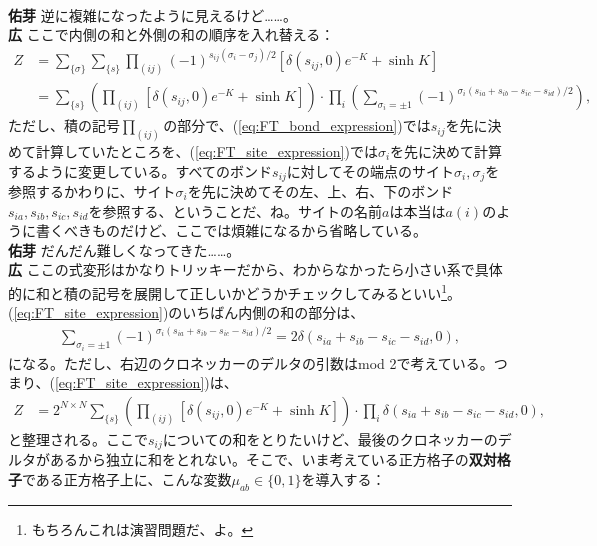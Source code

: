 \documentclass[paper=b5j,fontsize=12Q,jafontsize=12Q,baselineskip=21Q]{jlreq}
\DeclareRobustCommand{\hiron}{\textbf{広 }}
\DeclareRobustCommand{\umen}{\textbf{佑芽 }}
\begin{document}
\begin{refsection}
\begin{align}
\end{align}
\umen 逆に複雑になったように見えるけど……。
\\\hiron ここで内側の和と外側の和の順序を入れ替える：
\begin{align}
  Z&=\sum_{\{\sigma\}}\sum_{\{s\}}\prod_{(ij)}(-1)^{s_{ij}(\sigma_i-\sigma_j)/2}\left[\delta(s_{ij},0)e^{-K}+\sinh K\right]\label{eq:FT_bond_expression}\\
  &=\sum_{\{s\}}\left(\prod_{(ij)}\left[\delta(s_{ij},0)e^{-K}+\sinh K\right]\right)\cdot\prod_i\left(\sum_{\sigma_i=\pm 1}(-1)^{\sigma_i(s_{ia}+s_{ib}-s_{ic}-s_{id})/2}\right),\label{eq:FT_site_expression}
\end{align}
ただし、積の記号$\prod_{(ij)}$の部分で、(\ref{eq:FT_bond_expression})では$s_{ij}$を先に決めて計算していたところを、(\ref{eq:FT_site_expression})では$\sigma_i$を先に決めて計算するように変更している。すべてのボンド$s_{ij}$に対してその端点のサイト$\sigma_i,\sigma_j$を参照するかわりに、サイト$\sigma_i$を先に決めてその左、上、右、下のボンド$s_{ia},s_{ib},s_{ic},s_{id}$を参照する、ということだ、ね。サイトの名前$a$は本当は$a(i)$のように書くべきものだけど、ここでは煩雑になるから省略している。
\\\umen だんだん難しくなってきた……。
\\\hiron ここの式変形はかなりトリッキーだから、わからなかったら小さい系で具体的に和と積の記号を展開して正しいかどうかチェックしてみるといい\footnote{もちろんこれは演習問題だ、よ。}。(\ref{eq:FT_site_expression})のいちばん内側の和の部分は、
\begin{align}
  \sum_{\sigma_i=\pm 1}(-1)^{\sigma_i(s_{ia}+s_{ib}-s_{ic}-s_{id})/2}=2\delta(s_{ia}+s_{ib}-s_{ic}-s_{id},0),
\end{align}
になる。ただし、右辺のクロネッカーのデルタの引数はmod 2で考えている。つまり、(\ref{eq:FT_site_expression})は、
\begin{align}
  Z&=2^{N\times N}\sum_{\{s\}}\left(\prod_{(ij)}\left[\delta(s_{ij},0)e^{-K}+\sinh K\right]\right)\cdot \prod_i\delta(s_{ia}+s_{ib}-s_{ic}-s_{id},0),\label{eq:distribution_function_ising_bond_sum}
\end{align}
と整理される。ここで$s_{ij}$についての和をとりたいけど、最後のクロネッカーのデルタがあるから独立に和をとれない。そこで、いま考えている正方格子の\textbf{双対格子}である正方格子上に、こんな変数$\mu_{ab}\in\{0,1\}$を導入する：

\begin{center}
\end{center}
\end{refsection}
\end{document}
